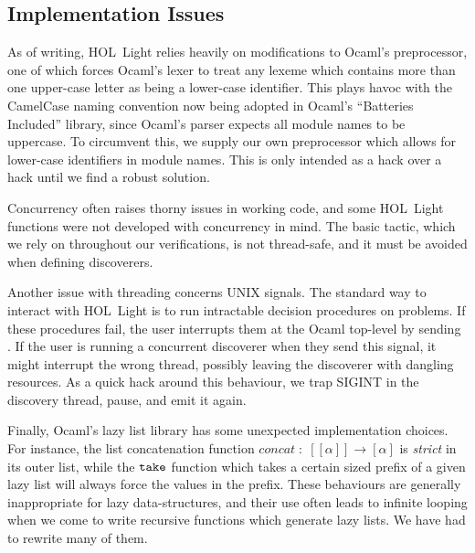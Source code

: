 \subsection{Implementation Issues}
As of writing, HOL~Light relies heavily on modifications to Ocaml's preprocessor, one of which forces Ocaml's lexer to treat any lexeme which contains more than one upper-case letter as being a lower-case identifier. This plays havoc with the CamelCase naming convention now being adopted in Ocaml's ``Batteries Included'' library, since Ocaml's parser expects all module names to be uppercase. To circumvent this, we supply our own preprocessor which allows for lower-case identifiers in module names. This is only intended as a hack over a hack until we find a robust solution.

Concurrency often raises thorny issues in working code, and some HOL~Light functions were not developed with concurrency in mind. The basic  tactic, which we rely on throughout our verifications, is not thread-safe, and it must be avoided when defining discoverers.


Another issue with threading concerns UNIX signals. The standard way to interact with HOL~Light is to run intractable decision procedures on problems. If these procedures fail, the user interrupts them at the Ocaml top-level by sending . If the user is running a concurrent discoverer when they send this signal, it might interrupt the wrong thread, possibly leaving the discoverer with dangling resources. As a quick hack around this behaviour, we trap SIGINT in the discovery thread, pause, and emit it again.

Finally, Ocaml's lazy list library has some unexpected implementation choices. For instance, the list concatenation function $concat\;:\;[[\alpha]]\rightarrow[\alpha]$ is \emph{strict} in its outer list, while the $\texttt{take}$ function which takes a certain sized prefix of a given lazy list will always force the values in the prefix. These behaviours are generally inappropriate for lazy data-structures, and their use often leads to infinite looping when we come to write recursive functions which generate lazy lists. We have had to rewrite many of them.


